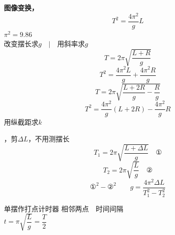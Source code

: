 \textbf{图像变换，}
\[
T^2=\dfrac{4\pi^2}{g}L
\]
$\pi^2=9.86$\\
改变摆长求$g$　$\big|$　用斜率求$g$
\[
T=2\pi\sqrt{\dfrac{L+R}{g}}
\]
\[
T^2=\dfrac{4\pi^2L}{g}+\dfrac{4\pi^2R}{g}
\]
\[
T=2\pi\sqrt{\dfrac{L+2R}{g}-\dfrac{R}{g}}
\]
\[
T^2=\dfrac{4\pi^2}{g}(L+2R)-\dfrac{4\pi^2}{g}R
\]
用纵截距求$k$ %

，剪$\Delta L$，不用测摆长
\[
T_1=2\pi\sqrt{\dfrac{L+\Delta L}{g}}\quad\text{①}
\]
\[
T_2=2\pi\sqrt{\dfrac{L}{g}}\quad\text{②}
\]
\[
\text{①}^2-\text{②}^2\qquad g=\dfrac{4\pi^2\Delta L}{T_1^2-T_2^2}
\]

单摆作打点计时器
相邻两点　时间间隔\\
$t=\pi\sqrt{\dfrac{L}{g}}=\dfrac{T}{2}$

